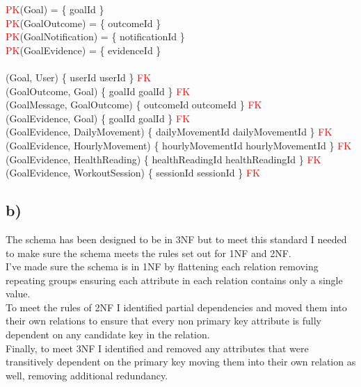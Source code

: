 \documentclass{article}
\begin{document}
\begin{zed}
\textcolor{red}{PK}(Goal) = \{ goalId \}  \\
\textcolor{red}{PK}(GoalOutcome) = \{ outcomeId \}  \\
\textcolor{red}{PK}(GoalNotification) = \{ notificationId \}  \\
\textcolor{red}{PK}(GoalEvidence) = \{ evidenceId \}  \\
\newline \\ 
(Goal, User) \mapsto \{ userId \mapsto userId \} \in \textcolor{red}{FK} \\
(GoalOutcome, Goal) \mapsto \{ goalId \mapsto goalId \} \in \textcolor{red}{FK} \\
(GoalMessage, GoalOutcome) \mapsto \{ outcomeId \mapsto outcomeId \} \in \textcolor{red}{FK} \\
(GoalEvidence, Goal) \mapsto \{ goalId \mapsto goalId \} \in \textcolor{red}{FK} \\
(GoalEvidence, DailyMovement) \mapsto \{ dailyMovementId \mapsto dailyMovementId \} \in \textcolor{red}{FK} \\
(GoalEvidence, HourlyMovement) \mapsto \{ hourlyMovementId \mapsto hourlyMovementId \} \in \textcolor{red}{FK} \\
(GoalEvidence, HealthReading) \mapsto \{ healthReadingId \mapsto healthReadingId \} \in \textcolor{red}{FK} \\
(GoalEvidence, WorkoutSession) \mapsto \{ sessionId \mapsto sessionId \} \in \textcolor{red}{FK} \\
\end{zed}

\pagebreak

\subsection*{\small b)}

The schema has been designed to be in 3NF but to meet this standard I needed to make sure the schema meets the rules set out for 1NF and 2NF. \\
\newline
I've made sure the schema is in 1NF by flattening each relation removing repeating groups ensuring each attribute in each relation contains only a single value. \\ 
\newline
To meet the rules of 2NF I identified partial dependencies and moved them into their own relations to ensure that every non primary key attribute is fully dependent on any candidate key in the relation. \\
\newline
Finally, to meet 3NF I identified and removed any attributes that were transitively dependent on the primary key moving them into their own relation as well, removing additional redundancy. 
\end{document}
